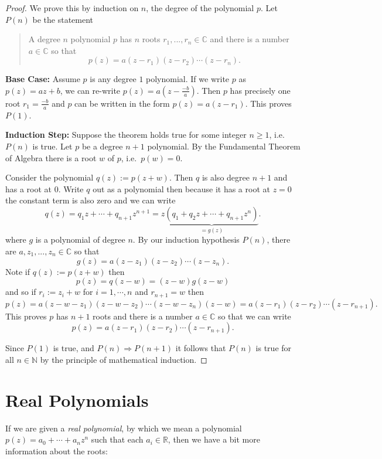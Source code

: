 \documentclass[11pt,dvipsnames]{book}
\numberwithin{equation}{section} %
\numberwithin{figure}{section} %
\numberwithin{table}{section} %
\begin{document}
\begin{proof}
We prove this by induction on \(n\), the degree of the polynomial \(p\).  
Let \(P(n)\) be the statement
\begin{quote}
A degree $n$ polynomial \(p\) has $n$ roots $r_{1},...,r_{n}\in\mathbb{C}$ and there is a number $a\in\mathbb{C}$ so that
\[
p(z) = a(z-r_{1})(z-r_{2})\cdots (z-r_{n}).\]
\end{quote}

{\bf Base Case:} Assume \(p\) is any degree \(1\) polynomial.  
If we write \(p\) as $p(z)=az+b$, we can re-write $p(z) = a(z-\frac{-b}{a})$.  
Then \(p\) has precisely one root \(r_1=\frac{-b}{a}\) and \(p\) can be written in the form \(p(z)=a(z-r_1)\). This proves \(P(1)\). 

{\bf Induction Step:} 
Suppose the theorem holds true for some integer $n\geq 1$, i.e. \(P(n)\) is true. 
Let $p$ be a degree $n+1$ polynomial. 
By the Fundamental Theorem of Algebra there is a root $w$ of $p$, i.e.~\(p(w)=0\).

Consider the polynomial $q(z):=p(z+w)$. 
Then \(q\) is also degree \(n+1\) and has a root at $0$.
Write \(q\) out as a polynomial then because it has a root at \(z=0\) the constant term is also zero and we can write 
\[
q(z) = q_{1}z+\cdots + q_{n+1}z^{n+1} 
= z\underbrace{(q_{1}+q_{2}z+\cdots + q_{n+1}z^{n})}_{=g(z)}.
\]
where \(g\) is a polynomial of degree \(n\).
By our induction hypothesis \(P(n)\), there are $a,z_{1},...,z_{n}\in\mathbb{C}$ so that 
\[
g(z) = a(z-z_{1})(z-z_{2})\cdots (z-z_{n}).
\]
Note if \(q(z):=p(z+w)\) then 
\[
p(z)=q(z-w)=(z-w)g(z-w)
\]
and so if \(r_{i}:=z_{i}+w\) for \(i=1,\cdots, n\) and \(r_{n+1}=w\)
then
\[
p(z) = a(z-w-z_{1})(z-w-z_{2})\cdots (z-w-z_{n})(z-w)
=a(z-r_{1})(z-r_{2})\cdots (z-r_{n+1}).
\]
This proves \(p\) has $n+1$ roots and there is a number $a\in\mathbb{C}$ so that we can write
\[
p(z) = a(z-r_{1})(z-r_{2})\cdots (z-r_{n+1}).\]


Since \(P(1)\) is true, and \(P(n)\Rightarrow P(n+1)\) it follows that \(P(n)\) is true for all \(n\in\mathbb{N}\) by the principle of mathematical induction.
\end{proof}

\section{Real Polynomials}
 
If we are given a {\it real polynomial}, by which we mean a polynomial $p(z)=a_{0}+\cdots + a_{n}z^{n}$ such that each $a_i \in \mathbb{R}$, then we have a bit more information about the roots:
\end{document}
